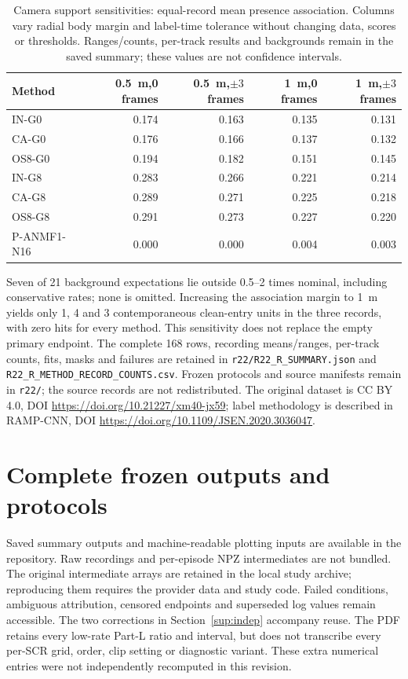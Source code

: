 \documentclass[10pt]{article}
\begin{document}
\begin{table}[htbp]\centering\small
\caption{Camera support sensitivities: equal-record mean presence association. Columns vary radial body margin and label-time tolerance without changing data, scores or thresholds. Ranges/counts, per-track results and backgrounds remain in the saved summary; these values are not confidence intervals.}\label{tab:uw_sensitivity}
\begin{tabular}{lrrrr}\toprule
Method & 0.5~m,0 frames & 0.5~m,$\pm3$ frames & 1~m,0 frames & 1~m,$\pm3$ frames\\\midrule
IN-G0 & 0.174 & 0.163 & 0.135 & 0.131\\
CA-G0 & 0.176 & 0.166 & 0.137 & 0.132\\
OS8-G0 & 0.194 & 0.182 & 0.151 & 0.145\\
IN-G8 & 0.283 & 0.266 & 0.221 & 0.214\\
CA-G8 & 0.289 & 0.271 & 0.225 & 0.218\\
OS8-G8 & 0.291 & 0.273 & 0.227 & 0.220\\
P-ANMF1-N16 & 0.000 & 0.000 & 0.004 & 0.003\\
\bottomrule\end{tabular}\end{table}
Seven of 21 background expectations lie outside 0.5--2 times nominal, including conservative rates; none is omitted. Increasing the association margin to 1~m yields only 1, 4 and 3 contemporaneous clean-entry units in the three records, with zero hits for every method. This sensitivity does not replace the empty primary endpoint. The complete 168 rows, recording means/ranges, per-track counts, fits, masks and failures are retained in \texttt{r22/R22\_R\_SUMMARY.json} and \texttt{R22\_R\_METHOD\_RECORD\_COUNTS.csv}. Frozen protocols and source manifests remain in \texttt{r22/}; the source records are not redistributed. The original dataset is CC BY 4.0, DOI \url{https://doi.org/10.21227/xm40-jx59}; label methodology is described in RAMP-CNN, DOI \url{https://doi.org/10.1109/JSEN.2020.3036047}.

\section{Complete frozen outputs and protocols}\label{sup:repository}
Saved summary outputs and machine-readable plotting inputs are available in the repository. Raw recordings and per-episode NPZ intermediates are not bundled. The original intermediate arrays are retained in the local study archive; reproducing them requires the provider data and study code. Failed conditions, ambiguous attribution, censored endpoints and superseded log values remain accessible. The two corrections in Section~\ref{sup:indep} accompany reuse. The PDF retains every low-rate Part-L ratio and interval, but does not transcribe every per-SCR grid, order, clip setting or diagnostic variant. These extra numerical entries were not independently recomputed in this revision.
\end{document}
